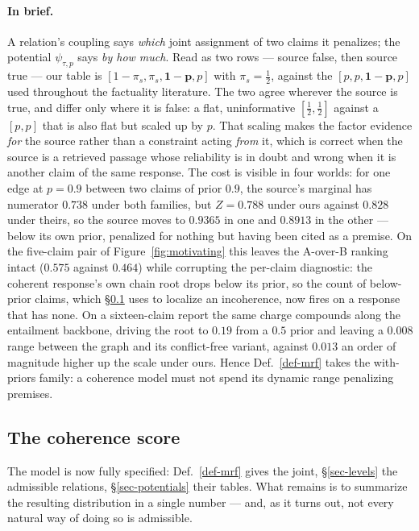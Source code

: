 \paragraph{In brief.} A relation's coupling says \emph{which} joint assignment of two claims it penalizes;
the potential $\psi_{\tau,p}$ says \emph{by how much}. Read as two rows --- source false, then source true ---
our \ent{} table is $[1{-}\pi_s,\pi_s,\mathbf{1{-}p},p]$ with $\pi_s=\tfrac12$, against the
$[p,p,\mathbf{1{-}p},p]$ used throughout the factuality literature. The two agree wherever the source is true,
and differ only where it is false: a flat, uninformative $[\tfrac12,\tfrac12]$ against a $[p,p]$ that is also
flat but scaled up by $p$. That scaling makes the factor evidence \emph{for} the source rather than a constraint
acting \emph{from} it, which is correct when the source is a retrieved passage whose reliability is in doubt and
wrong when it is another claim of the same response. The cost is visible in four worlds: for one \ent{} edge at
$p=0.9$ between two claims of prior $0.9$, the source's marginal has numerator $0.738$ under both families, but
$Z=0.788$ under ours against $0.828$ under theirs, so the source moves to $0.9365$ in one and $0.8913$ in the
other --- below its own prior, penalized for nothing but having been cited as a premise. On the five-claim pair
of Figure~\ref{fig:motivating} this leaves the A-over-B ranking intact ($0.575$ against $0.464$) while
corrupting the per-claim diagnostic: the coherent response's own chain root drops below its prior, so the count
of below-prior claims, which \S\ref{sec-score} uses to localize an incoherence, now fires on a response that
has none. On a sixteen-claim report the same charge compounds along the entailment backbone, driving the root to
$0.19$ from a $0.5$ prior and leaving a $0.008$ range between the graph and its conflict-free variant, against
$0.013$ an order of magnitude higher up the scale under ours. Hence Def.~\ref{def-mrf} takes the with-priors
family: a coherence model must not spend its dynamic range penalizing premises.

\subsection{The coherence score}
\label{sec-score}

The model is now fully specified: Def.~\ref{def-mrf} gives the joint, \S\ref{sec-levels} the admissible
relations, \S\ref{sec-potentials} their tables. What remains is to summarize the resulting distribution in a
single number --- and, as it turns out, not every natural way of doing so is admissible.

